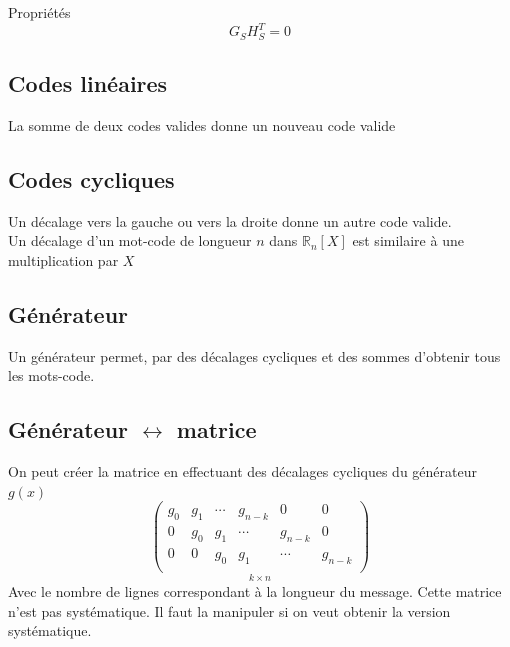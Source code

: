 \documentclass[resume.tex]{subfiles}
\begin{document}
Propriétés
$$G_SH_S^T=0$$
\subsection{Codes linéaires}
La somme de deux codes valides donne un nouveau code valide
\subsection{Codes cycliques}
Un décalage vers la gauche ou vers la droite donne un autre code valide.\\
Un décalage d'un mot-code de longueur $n$ dans $\mathbb{R}_n[X]$ est similaire à une multiplication par $X$
\subsection{Générateur}
Un générateur permet, par des décalages cycliques et des sommes d'obtenir tous les mots-code.
\subsection{Générateur $\leftrightarrow$ matrice}
On peut créer la matrice en effectuant des décalages cycliques du générateur $g(x)$
$$\underset{k\times n}{\begin{pmatrix}
g_0 & g_1 & \cdots & g_{n-k} & 0 & 0\\
0 & g_0 & g_1 & \cdots & g_{n-k} & 0\\
0 & 0 & g_0 & g_1 & \cdots & g_{n-k}\\
\end{pmatrix}}$$
Avec le nombre de lignes correspondant à la longueur du message. Cette matrice n'est pas systématique. Il faut la manipuler si on veut obtenir la version systématique.
\end{document}
